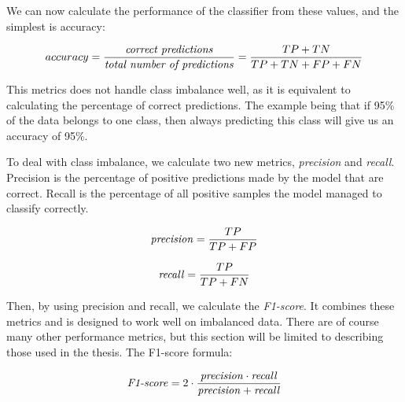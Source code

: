         We can now calculate the performance of the classifier from these values, and the simplest is accuracy\cite{powers2020evaluation_f1_recall_precision}:
        
        \begin{equation}
            accuracy = \dfrac{\textrm{\textit{correct predictions}}}{\textrm{\textit{total number of predictions}}} = \dfrac{TP+TN}{TP+TN+FP+FN} 
        \end{equation}
        
        This metrics does not handle class imbalance well\cite{powers2020evaluation_f1_recall_precision}, as it is equivalent to calculating the percentage of correct predictions. The example being that if 95\% of the data belongs to one class, then always predicting this class will give us an accuracy of 95\%.
        
        To deal with class imbalance, we calculate two new metrics, \textit{precision} and \textit{recall}\cite{powers2020evaluation_f1_recall_precision}. Precision is the percentage of positive predictions made by the model that are correct. Recall is the percentage of all positive samples the model managed to classify correctly.
        
        \begin{equation}
            \textrm{\textit{precision}} = \dfrac{TP}{TP+FP}
        \end{equation}
        
        \begin{equation}
            \textrm{\textit{recall}} = \dfrac{TP}{TP+FN}
        \end{equation}
        
        Then, by using precision and recall, we calculate the \textit{F1-score}\cite{powers2020evaluation_f1_recall_precision}. It combines these metrics and is designed to work well on imbalanced data. There are of course many other performance metrics, but this section will be limited to describing those used in the thesis. The F1-score formula:
        
        \begin{equation}
            \textrm{\textit{F1-score}} = 2 \cdot \dfrac{\textrm{\textit{precision}} \cdot \textrm{\textit{recall}}}{\textrm{\textit{precision}} + \textrm{\textit{recall}}}
        \end{equation}
        
